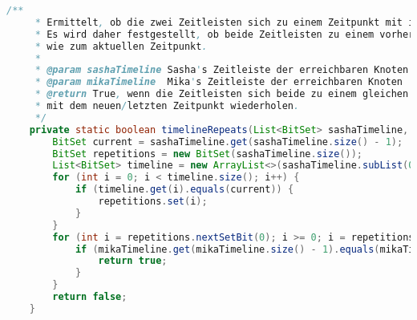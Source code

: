 \documentclass[a4paper,10pt,ngerman]{scrartcl}
\begin{document}
    \begin{lstlisting}[frame=single,language=Java,title=Methode timelineRepeats,breaklines=true]
    /**
     * Ermittelt, ob die zwei Zeitleisten sich zu einem Zeitpunkt mit ihrem letzten Eintrag wiederholen.
     * Es wird daher festgestellt, ob beide Zeitleisten zu einem vorherigen Zeitpunkt an den genau gleichen Knoten waren,
     * wie zum aktuellen Zeitpunkt.
     *
     * @param sashaTimeline Sasha's Zeitleiste der erreichbaren Knoten
     * @param mikaTimeline  Mika's Zeitleiste der erreichbaren Knoten
     * @return True, wenn die Zeitleisten sich beide zu einem gleichen Zeitpunkt
     * mit dem neuen/letzten Zeitpunkt wiederholen.
     */
    private static boolean timelineRepeats(List<BitSet> sashaTimeline, List<BitSet> mikaTimeline) {
        BitSet current = sashaTimeline.get(sashaTimeline.size() - 1);
        BitSet repetitions = new BitSet(sashaTimeline.size());
        List<BitSet> timeline = new ArrayList<>(sashaTimeline.subList(0, sashaTimeline.size() - 1));
        for (int i = 0; i < timeline.size(); i++) {
            if (timeline.get(i).equals(current)) {
                repetitions.set(i);
            }
        }
        for (int i = repetitions.nextSetBit(0); i >= 0; i = repetitions.nextSetBit(i + 1)) {
            if (mikaTimeline.get(mikaTimeline.size() - 1).equals(mikaTimeline.get(i))) {
                return true;
            }
        }
        return false;
    }
    \end{lstlisting}
\end{document}
